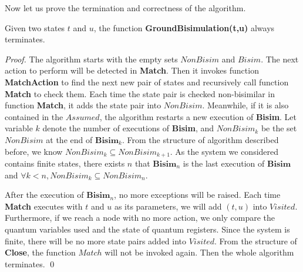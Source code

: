 \documentclass[a4paper,runningheads]{llncs}
\begin{document}
Now let us prove the termination and correctness of the algorithm. 


\begin{theorem}[Termination]\label{thm:termination}
Given two states $t$ and $u$, the function \textbf{GroundBisimulation(t,u)} always terminates.
\end{theorem}
\begin{proof}
The algorithm starts with the empty sets $NonBisim$ and $Bisim$. The next action to perform will be detected in \textbf{Match}. Then it invokes function \textbf{MatchAction} to find the next new pair of states and recursively call function \textbf{Match} to check them. Each time the state pair is checked non-bisimilar in function \textbf{Match}, it adds the state pair into $NonBisim$. Meanwhile, if it is also contained in the $Assumed$, the algorithm restarts a new execution of \textbf{Bisim}. Let variable $k$ denote the number of executions of \textbf{Bisim}, and $NonBisim_{k}$ be the set $NonBisim$ at the end of $\textbf{Bisim}_{k}$. From the structure of algorithm described before, we know $NonBisim_{k}\subseteq NonBisim_{k+1}$. As the system we considered contains finite states, there exists $n$ that $\textbf{Bisim}_{n}$ is the last execution of $\textbf{Bisim}$ and $\forall k<n, NonBisim_{k}\subseteq NonBisim_{n}$.

After the execution of $\textbf{Bisim}_{n}$, no more exceptions will be raised. Each time \textbf{Match} executes with $t$ and $u$ as its parameters, we will add $(t,u)$ into $Visited$. Furthermore, if we reach a node with no more action, we only compare the quantum variables used and the state of quantum registers. Since the system is finite, there will be no more state pairs added into $Visited$. From the structure of \textbf{Close}, the function $Match$ will not be invoked again. Then the whole algorithm terminates.
\qed
\end{proof}
\end{document}
